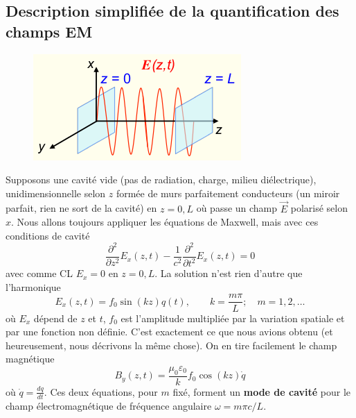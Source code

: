 	\subsection{Description simplifiée de la quantification des champs EM}
	\begin{figure}
	\vspace{-5mm}
	\includegraphics[scale=0.7]{ch2/image6.png}
	\end{figure}
	Supposons une cavité vide (pas de radiation, charge, milieu diélectrique), unidimensionnelle selon $z$ 
	formée de murs parfaitement conducteurs (un miroir parfait, rien ne sort de la cavité) en $z=0,L$ où passe
	 un champ $\vec{E}$ polarisé selon $x$. Nous allons toujours appliquer les équations de Maxwell, mais avec 
	 ces conditions de cavité
	\begin{equation}
	\dfrac{\partial^2}{\partial z^2}E_x(z,t) -\frac{1}{c^2}\dfrac{\partial^2}{\partial t^2}E_x(z,t)=0
	\end{equation}
	avec comme CL $E_x=0$ en $z=0,L$. La solution n'est rien d'autre que l'harmonique
	\begin{equation}
	E_x(z,t) = f_0\sin(kz)q(t),\qquad k=\frac{m\pi}{L};\quad m=1,2,\dots
	\end{equation}
	où $E_x$ dépend de $z$ et $t$, $f_0$ est l'amplitude multipliée par la variation spatiale et par une 
	fonction non définie. C'est exactement ce que nous avions obtenu (et heureusement, nous décrivons la 
	même chose). On en tire facilement le champ magnétique
	\begin{equation}
	B_y(z,t) = \frac{\mu_0\varepsilon_0}{k}f_0\cos(kz)\dot{q}
	\end{equation}
	où $\dot{q} =\frac{dq}{dt}$. Ces deux équations, pour $m$ fixé, forment un \textbf{mode de cavité} pour 
	le champ électromagnétique de fréquence angulaire $\omega = m\pi c/L$.\\
	
